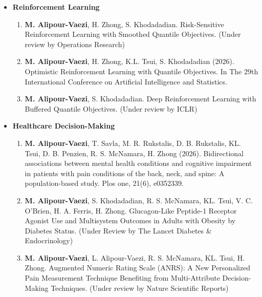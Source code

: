 \documentclass[9pt,a4paper]{extarticle}
\newcommand{\CategoryFont}
    {\fontsize{9.5}{10.35}\selectfont}
\newcommand{\BodyFont}
    {\fontsize{8.5}{9.30}\selectfont}
\newcommand{\cvcategory}[1]{%
    {\CategoryFont\bfseries\color{CVBody}#1}%
}
\newenvironment{cvcatlist}{%
    \begin{itemize}[
        leftmargin=0pt,
        labelsep=0pt,
        label={},
        topsep=0pt,
        itemsep=-0.5pt,
        parsep=0pt,
        partopsep=0pt
    ]
}{%
    \end{itemize}
}
\newenvironment{cvsublist}{%
    \begin{enumerate}[
        leftmargin=0.24in,
        labelsep=0.04in,
        label={\BodyFont\color{CVBody}\arabic*.},
        start=1,
        topsep=-0.8pt,
        itemsep=-0.8pt,
        parsep=0pt,
        partopsep=0pt
    ]
}{%
    \end{enumerate}
}
\newcommand{\pubitem}[1]{%
    \item\relax
    {\BodyFont\color{CVBody}\ignorespaces#1\unskip}%
}
\begin{document}
\begin{cvcatlist}



\item \cvcategory{Reinforcement Learning}

\begin{cvsublist}
\pubitem{
\textbf{M. Alipour-Vaezi},
H. Zhong,
S. Khodadadian.
Risk-Sensitive Reinforcement Learning with Smoothed Quantile Objectives.
(Under review by Operations Research)
}

\pubitem{
\textbf{M. Alipour-Vaezi},
H. Zhong,
K.L. Tsui,
S. Khodadadian
(2026).
Optimistic Reinforcement Learning with Quantile Objectives.
In The 29th International Conference on Artificial Intelligence and Statistics.
}

\pubitem{
\textbf{M. Alipour-Vaezi},
S. Khodadadian.
Deep Reinforcement Learning with Buffered Quantile Objectives.
(Under review by ICLR)
}

\end{cvsublist}



\item \cvcategory{Healthcare Decision-Making}

\begin{cvsublist}

\pubitem{
\textbf{M. Alipour-Vaezi},
T. Savla,
M. R. Rukstalis,
D. B. Rukstalis,
KL. Tsui,
D. B. Penzien,
R. S. McNamara,
H. Zhong
(2026).
Bidirectional associations between mental health conditions
and cognitive impairment in patients with pain conditions
of the back, neck, and spine:
A population-based study.
Plos one, 21(6), e0352339.
}

\pubitem{
\textbf{M. Alipour-Vaezi},
S. Khodadadian,
R. S. McNamara,
KL. Tsui,
V. C. O'Brien,
H. A. Ferris,
H. Zhong.
Glucagon-Like Peptide-1 Receptor Agonist Use and Multisystem Outcomes
in Adults with Obesity by Diabetes Status.
(Under Review by The Lancet Diabetes \& Endocrinology)
}

\pubitem{
\textbf{M. Alipour-Vaezi},
L. Alipour-Vaezi,
R. S. McNamara,
KL. Tsui,
H. Zhong.
Augmented Numeric Rating Scale (ANRS):
A New Personalized Pain Measurement Technique
Benefiting from Multi-Attribute Decision-Making Techniques. (Under review by Nature Scientific Reports)
}


\end{cvsublist}
\end{cvcatlist}
\end{document}
